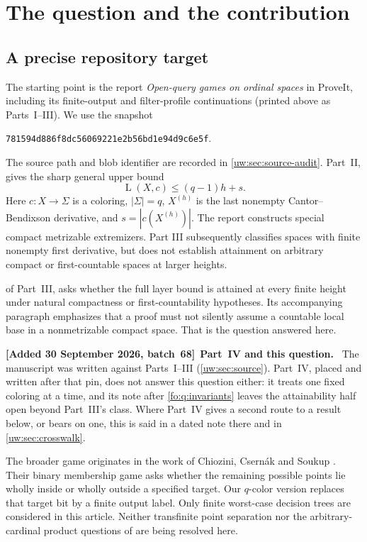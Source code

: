 \documentclass[11pt,letterpaper]{article}
\numberwithin{equation}{section}
\theoremstyle{definition}
\theoremstyle{remark}
\theoremstyle{definition}
\newcommand{\layers}{\operatorname{L}}
\newenvironment{writenotee}[1][]{\par\smallskip\begingroup\small\sloppy
 \noindent\textbf{[Added 30 September 2026, batch~68]}\if\relax\detokenize{#1}\relax\else~\textbf{#1.}\fi\ }%
 {\par\endgroup\smallskip}
\begin{document}
\section{The question and the contribution}\label{uw:sec:intro}

\subsection{A precise repository target}
The starting point is the report \emph{Open-query games on ordinal spaces}
in ProveIt, including its finite-output and filter-profile continuations
(printed above as Parts~I--III). We use the snapshot
\begin{center}
\texttt{781594d886f8dc56069221e2b56bd1e94d9c6e5f}.
\end{center}
The source path and blob identifier are recorded in \cref{uw:sec:source-audit}.
Part~II,  gives the sharp general upper bound
\begin{equation}\label{uw:eq:old-bound}
 \layers(X,c)\le (q-1)h+s.
\end{equation}
Here $c:X\to\Sigma$ is a coloring, $|\Sigma|=q$, $X^{(h)}$ is the last
nonempty Cantor--Bendixson derivative, and $s=|c(X^{(h)})|$. The report
constructs special compact metrizable extremizers. Part III subsequently
classifies spaces with finite nonempty first derivative, but does not establish
attainment on arbitrary compact or first-countable spaces at larger heights.

 of Part~III,  asks whether the full layer bound
is attained at every finite height under natural compactness or
first-countability hypotheses. Its accompanying paragraph emphasizes that a
proof must not silently assume a countable local base in a nonmetrizable
compact space. That is the question answered here.

\begin{writenotee}[Part~IV and this question]
The manuscript was written against Parts~I--III (\cref{uw:sec:source}).
Part~IV, placed and written after that pin, does not answer this question
either: it treats one fixed coloring at a time, and its note after
\cref{fo:q:invariants} leaves the attainability half open beyond Part~III's
class. Where Part~IV gives a second route to a result below, or bears on
one, this is said in a dated note there and in \cref{uw:sec:crosswalk}.
\end{writenotee}

The broader game originates in the work of Chiozini, Csern\'ak and Soukup
\cite{CCS}. Their binary membership game asks whether the remaining possible
points lie wholly inside or wholly outside a specified target. Our $q$-color
version replaces that target bit by a finite output label. Only finite
worst-case decision trees are considered in this article. Neither transfinite
point separation nor the arbitrary-cardinal product questions of
\cite{CCS} are being resolved here.
\end{document}
